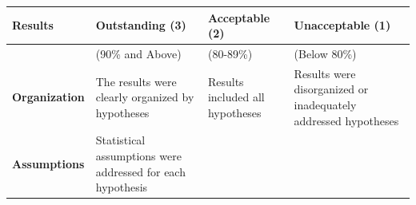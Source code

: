 \documentclass[
  openany]{book}
\begin{document}
\begin{longtable}[]{@{}llll@{}}
\toprule
\begin{minipage}[b]{0.22\columnwidth}\raggedright
Results\strut
\end{minipage} & \begin{minipage}[b]{0.22\columnwidth}\raggedright
Outstanding (3)\strut
\end{minipage} & \begin{minipage}[b]{0.22\columnwidth}\raggedright
Acceptable (2)\strut
\end{minipage} & \begin{minipage}[b]{0.22\columnwidth}\raggedright
Unacceptable (1)\strut
\end{minipage}\tabularnewline
\midrule
\endhead
\begin{minipage}[t]{0.22\columnwidth}\raggedright
\strut
\end{minipage} & \begin{minipage}[t]{0.22\columnwidth}\raggedright
(90\% and Above)\strut
\end{minipage} & \begin{minipage}[t]{0.22\columnwidth}\raggedright
(80-89\%)\strut
\end{minipage} & \begin{minipage}[t]{0.22\columnwidth}\raggedright
(Below 80\%)\strut
\end{minipage}\tabularnewline
\begin{minipage}[t]{0.22\columnwidth}\raggedright
\textbf{Organization}\strut
\end{minipage} & \begin{minipage}[t]{0.22\columnwidth}\raggedright
The results were clearly organized by hypotheses\strut
\end{minipage} & \begin{minipage}[t]{0.22\columnwidth}\raggedright
Results included all hypotheses\strut
\end{minipage} & \begin{minipage}[t]{0.22\columnwidth}\raggedright
Results were disorganized or inadequately addressed hypotheses\strut
\end{minipage}\tabularnewline
\begin{minipage}[t]{0.22\columnwidth}\raggedright
\textbf{Assumptions}\strut
\end{minipage} & \begin{minipage}[t]{0.22\columnwidth}\raggedright
Statistical assumptions were addressed for each hypothesis\strut
\end{minipage} & \begin{minipage}[t]{0.22\columnwidth}\raggedright

\end{minipage}
\end{longtable}
\end{document}
